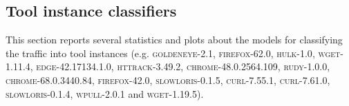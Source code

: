 \documentclass[times,review]{article}
\begin{document}
\subsection*{Tool instance classifiers}

This section reports several statistics and plots about the models for classifying the traffic into tool instances
(e.g. \textsc{goldeneye-2.1}, \textsc{firefox-62.0}, \textsc{hulk-1.0}, \textsc{wget-1.11.4},
\textsc{edge-42.17134.1.0}, \textsc{httrack-3.49.2}, \textsc{chrome-48.0.2564.109}, \textsc{rudy-1.0.0},
\textsc{chrome-68.0.3440.84}, \textsc{firefox-42.0}, \textsc{slowloris-0.1.5}, \textsc{curl-7.55.1},
\textsc{curl-7.61.0}, \textsc{slowloris-0.1.4}, \textsc{wpull-2.0.1} and \textsc{wget-1.19.5}).



\end{document}
